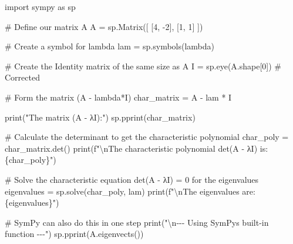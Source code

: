 \documentclass[
  letterpaper,
  DIV=11,
  numbers=noendperiod]{scrreprt}
\newenvironment{Shaded}{\begin{snugshade}}{\end{snugshade}}
\newcommand{\BuiltInTok}[1]{\textcolor[rgb]{0.00,0.23,0.31}{#1}}
\newcommand{\CharTok}[1]{\textcolor[rgb]{0.13,0.47,0.30}{#1}}
\newcommand{\CommentTok}[1]{\textcolor[rgb]{0.37,0.37,0.37}{#1}}
\newcommand{\DecValTok}[1]{\textcolor[rgb]{0.68,0.00,0.00}{#1}}
\newcommand{\ImportTok}[1]{\textcolor[rgb]{0.00,0.46,0.62}{#1}}
\newcommand{\NormalTok}[1]{\textcolor[rgb]{0.00,0.23,0.31}{#1}}
\newcommand{\OperatorTok}[1]{\textcolor[rgb]{0.37,0.37,0.37}{#1}}
\newcommand{\SpecialCharTok}[1]{\textcolor[rgb]{0.37,0.37,0.37}{#1}}
\newcommand{\SpecialStringTok}[1]{\textcolor[rgb]{0.13,0.47,0.30}{#1}}
\newcommand{\StringTok}[1]{\textcolor[rgb]{0.13,0.47,0.30}{#1}}
\begin{document}
\label{find-eigenvalues-symbolic}
\begin{Shaded}
\begin{Highlighting}[]
\ImportTok{import}\NormalTok{ sympy }\ImportTok{as}\NormalTok{ sp}

\CommentTok{\# Define our matrix A}
\NormalTok{A }\OperatorTok{=}\NormalTok{ sp.Matrix([}
\NormalTok{    [}\DecValTok{4}\NormalTok{, }\OperatorTok{{-}}\DecValTok{2}\NormalTok{],}
\NormalTok{    [}\DecValTok{1}\NormalTok{,  }\DecValTok{1}\NormalTok{]}
\NormalTok{])}

\CommentTok{\# Create a symbol for lambda}
\NormalTok{lam }\OperatorTok{=}\NormalTok{ sp.symbols(}\StringTok{\textquotesingle{}lambda\textquotesingle{}}\NormalTok{)}

\CommentTok{\# Create the Identity matrix of the same size as A}
\NormalTok{I }\OperatorTok{=}\NormalTok{ sp.eye(A.shape[}\DecValTok{0}\NormalTok{])  }\CommentTok{\# Corrected}

\CommentTok{\# Form the matrix (A {-} lambda*I)}
\NormalTok{char\_matrix }\OperatorTok{=}\NormalTok{ A }\OperatorTok{{-}}\NormalTok{ lam }\OperatorTok{*}\NormalTok{ I}

\BuiltInTok{print}\NormalTok{(}\StringTok{"The matrix (A {-} λI):"}\NormalTok{)}
\NormalTok{sp.pprint(char\_matrix)}

\CommentTok{\# Calculate the determinant to get the characteristic polynomial}
\NormalTok{char\_poly }\OperatorTok{=}\NormalTok{ char\_matrix.det()}
\BuiltInTok{print}\NormalTok{(}\SpecialStringTok{f"}\CharTok{\textbackslash{}n}\SpecialStringTok{The characteristic polynomial det(A {-} λI) is: }\SpecialCharTok{\{}\NormalTok{char\_poly}\SpecialCharTok{\}}\SpecialStringTok{"}\NormalTok{)}

\CommentTok{\# Solve the characteristic equation det(A {-} λI) = 0 for the eigenvalues}
\NormalTok{eigenvalues }\OperatorTok{=}\NormalTok{ sp.solve(char\_poly, lam)}
\BuiltInTok{print}\NormalTok{(}\SpecialStringTok{f"}\CharTok{\textbackslash{}n}\SpecialStringTok{The eigenvalues are: }\SpecialCharTok{\{}\NormalTok{eigenvalues}\SpecialCharTok{\}}\SpecialStringTok{"}\NormalTok{)}

\CommentTok{\# SymPy can also do this in one step}
\BuiltInTok{print}\NormalTok{(}\StringTok{"}\CharTok{\textbackslash{}n}\StringTok{{-}{-}{-} Using SymPy\textquotesingle{}s built{-}in function {-}{-}{-}"}\NormalTok{)}
\NormalTok{sp.pprint(A.eigenvects())}
\end{Highlighting}
\end{Shaded}
\end{document}
